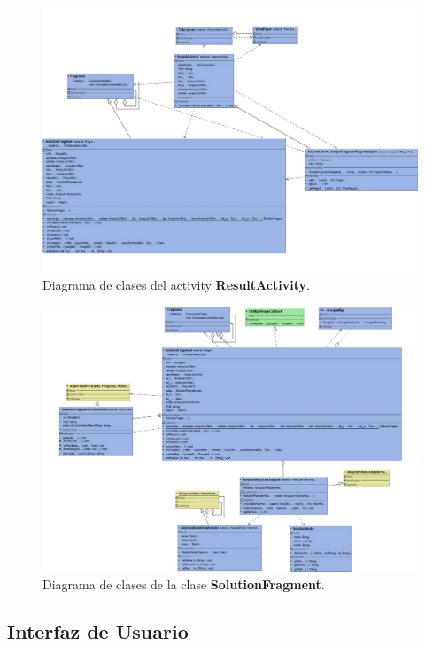 \begin{figure}[H]
	\centering
	\includegraphics[scale=0.8,angle=90]{imagenes/result_activity.pdf}
	\caption{Diagrama de clases del activity \textbf{ResultActivity}.}
	\label{fig:result_activity_diagram}
\end{figure}
\begin{figure}[H]
	\centering
	\includegraphics[scale=0.8,angle=90]{imagenes/result_fragment.pdf}
	\caption{Diagrama de clases de la clase \textbf{SolutionFragment}.}
	\label{fig:solution_recycler_diagram}
\end{figure}


\subsection[Interfaz de Usuario]{Interfaz de Usuario}

